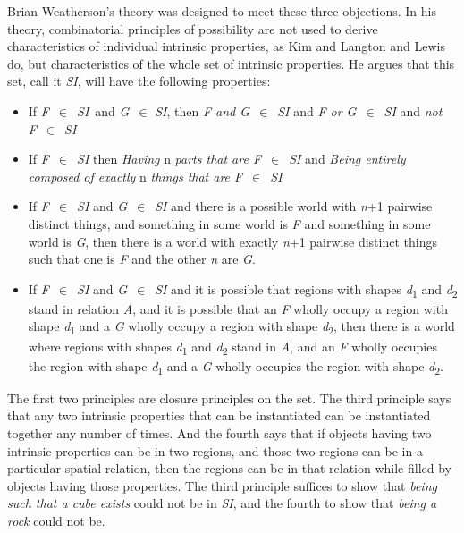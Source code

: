 Brian Weatherson's \citeyearpar{Weatherson2001-WEAIPA} theory was designed to meet these three objections. In his theory, combinatorial principles of possibility are not used to derive characteristics of individual intrinsic properties, as Kim and Langton and Lewis do, but characteristics of the whole set of intrinsic properties. He argues that this set, call it \textit{SI}, will have the following properties:

\begin{itemize}
\item If \textit{F}~${\in}$~\textit{SI}~and \textit{G}~${\in}$ \textit{SI}, then \textit{F and G}~${\in}$~\textit{SI} and \textit{F or G}~${\in}$~\textit{SI} and \textit{not F}~${\in}$~\textit{SI} 
\item If \textit{F}~${\in}$~\textit{SI} then \textit{Having} n \textit{parts that are F}~${\in}$~\textit{SI} and \textit{Being entirely composed of exactly} n \textit{things that are F}~${\in}$~\textit{SI} 
\item If \textit{F}~${\in}$~\textit{SI} and \textit{G}~${\in}$~\textit{SI} and there is a possible world with \textit{n}+1 pairwise distinct things, and something in some world is \textit{F} and something in some world is \textit{G}, then there is a world with exactly \textit{n}+1 pairwise distinct things such that one is \textit{F} and the other \textit{n} are \textit{G}. 
\item If \textit{F}~${\in}$~\textit{SI} and \textit{G}~${\in}$~\textit{SI} and it is possible that regions with shapes \textit{d}\textsubscript{1} and \textit{d}\textsubscript{2} stand in relation \textit{A}, and it is possible that an \textit{F} wholly occupy a region with shape \textit{d}\textsubscript{1} and a \textit{G} wholly occupy a region with shape \textit{d}\textsubscript{2}, then there is a world where regions with shapes \textit{d}\textsubscript{1} and \textit{d}\textsubscript{2} stand in \textit{A}, and an \textit{F} wholly occupies the region with shape \textit{d}\textsubscript{1} and a \textit{G} wholly occupies the region with shape \textit{d}\textsubscript{2}. 
\end{itemize}

\noindent The first two principles are closure principles on the set. The third principle says that any two intrinsic properties that can be instantiated can be instantiated together any number of times. And the fourth says that if objects having two intrinsic properties can be in two regions, and those two regions can be in a particular spatial relation, then the regions can be in that relation while filled by objects having those properties. The third principle suffices to show that \textit{being such that a cube exists} could not be in \textit{SI}, and the fourth to show that \textit{being a rock} could not be.

